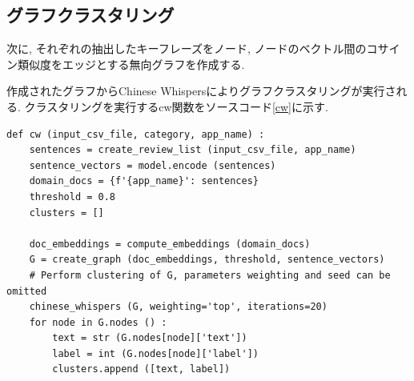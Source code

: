 


%

\subsection{グラフクラスタリング}
次に, それぞれの抽出したキーフレーズをノード, ノードのベクトル間のコサイン類似度をエッジとする無向グラフを作成する. 

作成されたグラフからChinese Whispersによりグラフクラスタリングが実行される. クラスタリングを実行するcw関数をソースコード\ref{cw}に示す. 

\begin{lstlisting}[caption=cw関数,label=cw]
  def cw (input_csv_file, category, app_name) :
    sentences = create_review_list (input_csv_file, app_name) 
    sentence_vectors = model.encode (sentences) 
    domain_docs = {f'{app_name}': sentences}
    threshold = 0.8
    clusters = []
    
    doc_embeddings = compute_embeddings (domain_docs) 
    G = create_graph (doc_embeddings, threshold, sentence_vectors) 
    # Perform clustering of G, parameters weighting and seed can be omitted
    chinese_whispers (G, weighting='top', iterations=20) 
    for node in G.nodes () :
        text = str (G.nodes[node]['text']) 
        label = int (G.nodes[node]['label']) 
        clusters.append ([text, label]) 
\end{lstlisting}

